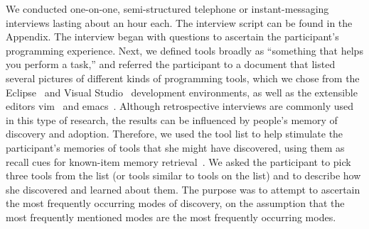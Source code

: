 \documentclass[smallextended]{svjour3}
\newcommand\contexts{modes\xspace}
\begin{document}
\noindent
We conducted one-on-one, semi-structured telephone or
instant-messaging interviews lasting about an hour each.
The interview script can be found in the Appendix.
The interview began with questions to ascertain the
participant's programming experience.
Next, we defined tools broadly as 
``something that helps you perform a task,''
and referred the participant to a document that listed several pictures of 
different kinds of programming tools, which we chose from the Eclipse~\cite{eclipse} and
Visual Studio~\cite{visualstudio} development environments, 
as well as the extensible editors vim~\cite{vim}
and emacs~\cite{emacs}.
Although retrospective interviews are commonly used in this type of research,
the results can be influenced by people's memory of
discovery and adoption. 
Therefore, we used the tool list to help stimulate the participant's memories of
tools that she might have discovered, using them as recall cues for known-item 
memory retrieval~\cite{allen89}.
We asked the participant to pick three tools from the list (or tools
similar to tools on the list) and to describe how she discovered and learned
about them. 
The purpose was to attempt to ascertain the most frequently occurring \contexts
of discovery, on the assumption that the most frequently mentioned \contexts
are the most frequently occurring \contexts.
       
\end{document}
